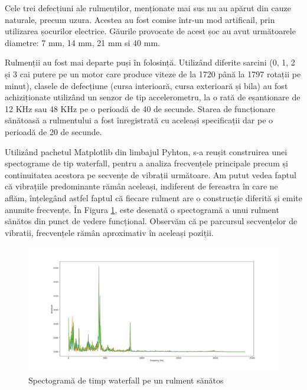 \documentclass[a4paper,12pt]{report}
\begin{document}
    	Cele trei defecțiuni ale rulmenților, menționate mai sus nu au apărut din cauze naturale, precum uzura. Acestea au fost comise într-un mod artificail, prin utilizarea șocurilor electrice. Găurile provocate de acest șoc au avut următoarele diametre: 7 mm, 14 mm, 21 mm si 40 mm. 
    	
    	Rulmenții au fost mai departe puși în folosință. Utilizând diferite sarcini (0, 1, 2 și 3 cai putere pe un motor care produce viteze de la 1720 până la 1797 rotații pe minut), clasele de defecțiune (cursa interioară, cursa exterioară și bila) au fost achiziționate utilizând un senzor de tip accelerometru, la o rată de eșantionare de 12 KHz sau 48 KHz pe o perioadă de 40 de secunde. Starea de funcționare sănătoasă a rulmentului a fost înregistrată cu aceleași specificații dar pe o perioadă de 20 de secunde.
    	
    	Utilizând pachetul Matplotlib din limbajul Pyhton, s-a reușit construirea unei spectograme de tip waterfall, pentru a analiza frecvențele principale precum și continuitatea acestora pe secvențe de vibrații următoare. Am putut vedea faptul că vibrațiile predominante rămân aceleași, indiferent de fereastra în care ne aflăm, înțelegând astfel faptul că fiecare rulment are o construcție diferită și emite anumite frecvențe. În Figura \ref{fig:waterfall_bearing_healthy}, este desenată o spectogramă a unui rulment sănătos din punct de vedere funcțional. Observăm că pe parcursul secvențelor de vibratii, frecvențele rămân aproximativ în aceleași poziții.
    	
    	\begin{figure}[H]
    		\begin{center}
    			\includegraphics[scale=0.25]{images/waterfall_bearing_normal.png}
    		\end{center}
    		\caption{Spectogramă de timp waterfall pe un rulment sănătos}
    		\label{fig:waterfall_bearing_healthy}
    	\end{figure}
    	
\end{document}
